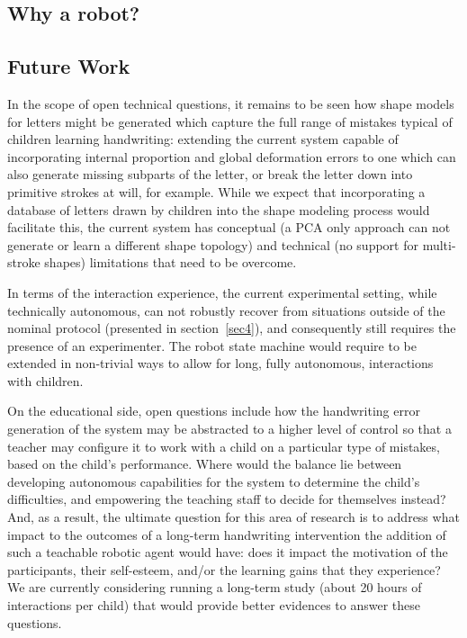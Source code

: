 \documentclass{sig-alternate}
\begin{document}
\subsection{Why a robot?}



\subsection{Future Work}

In the scope of open technical questions, it remains to be seen how shape models
for letters might be generated which capture the full range of mistakes typical
of children learning handwriting: extending the current system capable of
incorporating internal proportion and global deformation errors to one which can
also generate missing subparts of the letter, or break the letter down into
primitive strokes at will, for example. While we expect that incorporating a
database of letters drawn by children into the shape modeling process would
facilitate this, the current system has conceptual (a PCA only approach can not
generate or learn a different shape topology) and technical (no support for
multi-stroke shapes) limitations that need to be overcome.

In terms of the interaction experience, the current experimental setting, while
technically autonomous, can not robustly recover from situations outside of the
nominal protocol (presented in section~\ref{sec4}), and consequently still requires the
presence of an experimenter. The robot state machine would require to be
extended in non-trivial ways to allow for long, fully autonomous, interactions
with children.


On the educational side, open questions include how the handwriting error
generation of the system may be abstracted to a higher level of control so that
a teacher may configure it to work with a child on a particular type of
mistakes, based on the child's performance. Where would the balance lie between
developing autonomous capabilities for the system to determine the child's
difficulties, and empowering the teaching staff to decide for themselves
instead? And, as a result, the ultimate question for this area of research is
to address what impact to the outcomes of a long-term handwriting intervention the
addition of such a teachable robotic agent would have: does it impact the
motivation of the participants, their self-esteem, and/or the learning gains
that they experience? We are currently considering running a long-term study
(about 20 hours of interactions per child) that would provide better evidences
to answer these questions.
\end{document}
